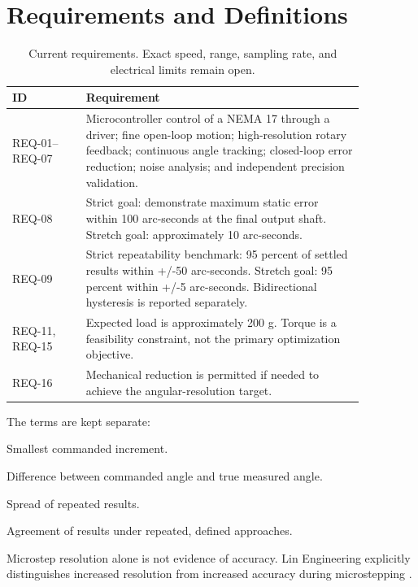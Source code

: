 \documentclass[11pt,a4paper]{article}
\begin{document}
\section{Requirements and Definitions}

\begin{table}[ht]
\centering
\begin{tabular}{p{0.18\linewidth}p{0.68\linewidth}}
\toprule
\textbf{ID} & \textbf{Requirement} \\
\midrule
REQ-01--REQ-07 & Microcontroller control of a NEMA 17 through a driver; fine open-loop motion; high-resolution rotary feedback; continuous angle tracking; closed-loop error reduction; noise analysis; and independent precision validation. \\
REQ-08 & Strict goal: demonstrate maximum static error within 100 arc-seconds at the final output shaft. Stretch goal: approximately 10 arc-seconds. \\
REQ-09 & Strict repeatability benchmark: 95 percent of settled results within +/-50 arc-seconds. Stretch goal: 95 percent within +/-5 arc-seconds. Bidirectional hysteresis is reported separately. \\
REQ-11, REQ-15 & Expected load is approximately 200 g. Torque is a feasibility constraint, not the primary optimization objective. \\
REQ-16 & Mechanical reduction is permitted if needed to achieve the angular-resolution target. \\
\bottomrule
\end{tabular}
\caption{Current requirements. Exact speed, range, sampling rate, and electrical limits remain open.}
\end{table}

The terms are kept separate:
\begin{description}[leftmargin=25mm]
  \item[Resolution] Smallest commanded increment.
  \item[Accuracy] Difference between commanded angle and true measured angle.
  \item[Precision] Spread of repeated results.
  \item[Repeatability] Agreement of results under repeated, defined approaches.
\end{description}

Microstep resolution alone is not evidence of accuracy. Lin Engineering explicitly distinguishes increased resolution from increased accuracy during microstepping \cite{lin}.
\end{document}
